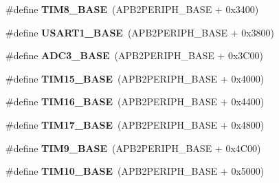 \begin{DoxyCompactItemize}
\item 
\hypertarget{group___peripheral__memory__map_ga5b72f698b7a048a6f9fcfe2efe5bc1db}{\#define {\bfseries T\-I\-M8\-\_\-\-B\-A\-S\-E}~(A\-P\-B2\-P\-E\-R\-I\-P\-H\-\_\-\-B\-A\-S\-E + 0x3400)}\label{group___peripheral__memory__map_ga5b72f698b7a048a6f9fcfe2efe5bc1db}

\item 
\hypertarget{group___peripheral__memory__map_ga86162ab3f740db9026c1320d46938b4d}{\#define {\bfseries U\-S\-A\-R\-T1\-\_\-\-B\-A\-S\-E}~(A\-P\-B2\-P\-E\-R\-I\-P\-H\-\_\-\-B\-A\-S\-E + 0x3800)}\label{group___peripheral__memory__map_ga86162ab3f740db9026c1320d46938b4d}

\item 
\hypertarget{group___peripheral__memory__map_gaca766f86c8e0b00a8e2b0224dcbb4c82}{\#define {\bfseries A\-D\-C3\-\_\-\-B\-A\-S\-E}~(A\-P\-B2\-P\-E\-R\-I\-P\-H\-\_\-\-B\-A\-S\-E + 0x3\-C00)}\label{group___peripheral__memory__map_gaca766f86c8e0b00a8e2b0224dcbb4c82}

\item 
\hypertarget{group___peripheral__memory__map_ga7ab42ce1846930569d742d339b554078}{\#define {\bfseries T\-I\-M15\-\_\-\-B\-A\-S\-E}~(A\-P\-B2\-P\-E\-R\-I\-P\-H\-\_\-\-B\-A\-S\-E + 0x4000)}\label{group___peripheral__memory__map_ga7ab42ce1846930569d742d339b554078}

\item 
\hypertarget{group___peripheral__memory__map_ga16c97093a531d763b0794c3e6d09e1bf}{\#define {\bfseries T\-I\-M16\-\_\-\-B\-A\-S\-E}~(A\-P\-B2\-P\-E\-R\-I\-P\-H\-\_\-\-B\-A\-S\-E + 0x4400)}\label{group___peripheral__memory__map_ga16c97093a531d763b0794c3e6d09e1bf}

\item 
\hypertarget{group___peripheral__memory__map_gaffbedbe30e8c4cffdea326d6c1800574}{\#define {\bfseries T\-I\-M17\-\_\-\-B\-A\-S\-E}~(A\-P\-B2\-P\-E\-R\-I\-P\-H\-\_\-\-B\-A\-S\-E + 0x4800)}\label{group___peripheral__memory__map_gaffbedbe30e8c4cffdea326d6c1800574}

\item 
\hypertarget{group___peripheral__memory__map_ga92ae902be7902560939223dd765ece08}{\#define {\bfseries T\-I\-M9\-\_\-\-B\-A\-S\-E}~(A\-P\-B2\-P\-E\-R\-I\-P\-H\-\_\-\-B\-A\-S\-E + 0x4\-C00)}\label{group___peripheral__memory__map_ga92ae902be7902560939223dd765ece08}

\item 
\hypertarget{group___peripheral__memory__map_ga3eff32f3801db31fb4b61d5618cad54a}{\#define {\bfseries T\-I\-M10\-\_\-\-B\-A\-S\-E}~(A\-P\-B2\-P\-E\-R\-I\-P\-H\-\_\-\-B\-A\-S\-E + 0x5000)}\label{group___peripheral__memory__map_ga3eff32f3801db31fb4b61d5618cad54a}


\end{DoxyCompactItemize}
